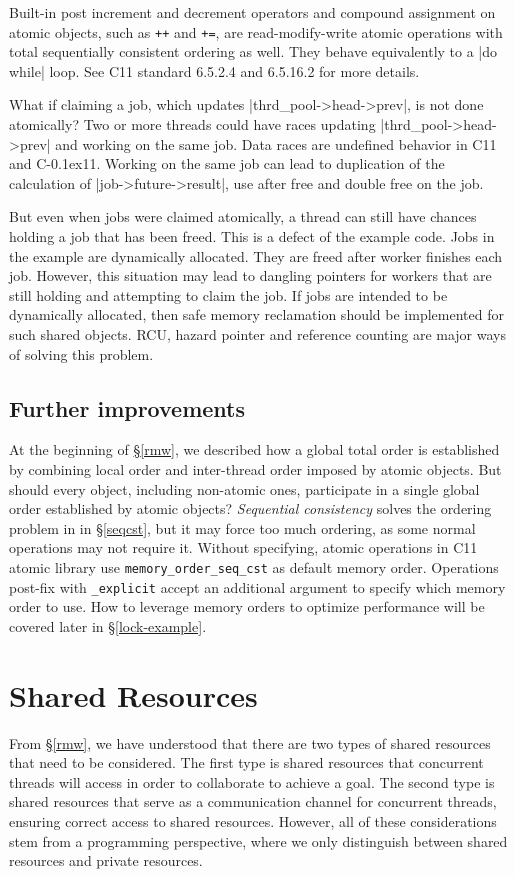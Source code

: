 \documentclass[fontsize=10pt, oneside]{scrartcl}
\newcommand{\monobox}[1]{\mbox{\texttt{#1}}}
\newcommand{\cplusplus}[1]{C\kern-0.1ex\raisebox{0.15ex}{\texttt{++}}}
\newcommand{\clang}[1]{C}
\newcommand{\introduce}[1]{\textit{#1}}
\newcommand{\secref}[1]{\hyperref[#1]{\textsc{\S}\ref*{#1}}}
\begin{document}
Built-in post increment and decrement operators and compound assignment on atomic objects, such as \monobox{++} and \monobox{+=}, are read-modify-write atomic operations with total sequentially consistent ordering as well. 
They behave equivalently to a \cc|do while| loop. See \clang{}11 standard 6.5.2.4 and 6.5.16.2 for more details.

What if claiming a job, which updates \cc|thrd_pool->head->prev|, is not done atomically?
Two or more threads could have races updating \cc|thrd_pool->head->prev| and working on the same job.
Data races are undefined behavior in \clang{}11 and \cplusplus{}11.
Working on the same job can lead to duplication of the calculation of \cc|job->future->result|, 
use after free and double free on the job.

But even when jobs were claimed atomically, a thread can still have chances holding a job that has been freed.
This is a defect of the example code.
Jobs in the example are dynamically allocated. They are freed after worker finishes each job. 
However, this situation may lead to dangling pointers for workers that are still holding and attempting to claim the job. 
If jobs are intended to be dynamically allocated, then safe memory reclamation should be implemented for such shared objects.
RCU, hazard pointer and reference counting are major ways of solving this problem.

\subsection{Further improvements}
At the beginning of \secref{rmw}, we described how a global total order is established by combining local order and inter-thread order imposed by atomic objects. 
But should every object, including non-atomic ones, participate in a single global order established by atomic objects?
\introduce{Sequential consistency} solves the ordering problem in in \secref{seqcst}, but it may force too much ordering, as some normal operations may not require it.
Without specifying, atomic operations in \clang{}11 atomic library use \monobox{memory\_order\_seq\_cst} as default memory order. Operations post-fix with \monobox{\_explicit} accept an additional argument to specify which memory order to use.
How to leverage memory orders to optimize performance will be covered later in \secref{lock-example}.

\section{Shared Resources}
\label{shared-resources}
From \secref{rmw}, we have understood that there are two types of shared resources that need to be considered. 
The first type is shared resources that concurrent threads will access in order to collaborate to achieve a goal. 
The second type is shared resources that serve as a communication channel for concurrent threads, 
ensuring correct access to shared resources. 
However, all of these considerations stem from a programming perspective, 
where we only distinguish between shared resources and private resources. 
\end{document}
